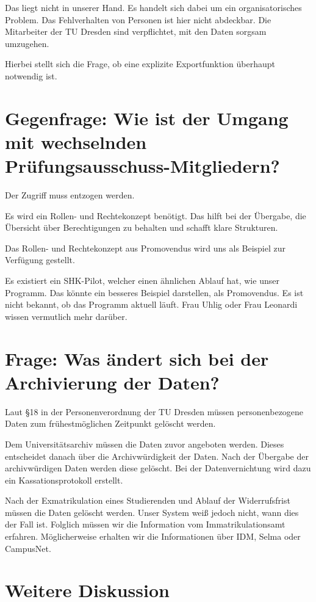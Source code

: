 \documentclass[ngerman]{tudscrreprt}
\begin{document}
Das liegt nicht in unserer Hand. Es handelt sich dabei um ein organisatorisches Problem. Das Fehlverhalten von Personen ist hier nicht abdeckbar. Die Mitarbeiter der TU Dresden sind verpflichtet, mit den Daten sorgsam umzugehen.

Hierbei stellt sich die Frage, ob eine explizite Exportfunktion überhaupt notwendig ist.

\section{Gegenfrage: Wie ist der Umgang mit wechselnden Prüfungsausschuss-Mitgliedern?}

Der Zugriff muss entzogen werden.

Es wird ein Rollen- und Rechtekonzept benötigt. Das hilft bei der Übergabe, die Übersicht über Berechtigungen zu behalten und schafft klare Strukturen.

Das Rollen- und Rechtekonzept aus Promovendus wird uns als Beispiel zur Verfügung gestellt.

Es existiert ein SHK-Pilot, welcher einen ähnlichen Ablauf hat, wie unser Programm. Das könnte ein besseres Beispiel darstellen, als Promovendus. Es ist nicht bekannt, ob das Programm aktuell läuft. Frau Uhlig oder Frau Leonardi wissen vermutlich mehr darüber.

\section{Frage: Was ändert sich bei der Archivierung der Daten?}

Laut §18 in der Personenverordnung der TU Dresden müssen personenbezogene Daten zum frühestmöglichen Zeitpunkt gelöscht werden.

Dem Universitätsarchiv müssen die Daten zuvor angeboten werden. Dieses entscheidet danach über die Archivwürdigkeit der Daten. Nach der Übergabe der archivwürdigen Daten werden diese gelöscht. Bei der Datenvernichtung wird dazu ein Kassationsprotokoll erstellt.

Nach der Exmatrikulation eines Studierenden und Ablauf der Widerrufsfrist müssen die Daten gelöscht werden. Unser System weiß jedoch nicht, wann dies der Fall ist. Folglich müssen wir die Information vom Immatrikulationsamt erfahren. Möglicherweise erhalten wir die Informationen über IDM, Selma oder CampusNet.

\section{Weitere Diskussion}
\end{document}
